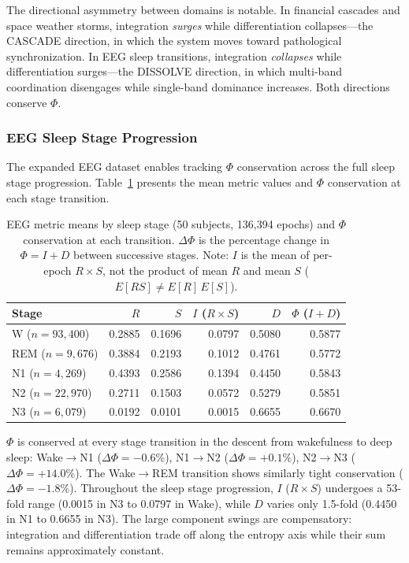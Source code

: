 \documentclass[12pt,a4paper]{article}
\begin{document}
The directional asymmetry between domains is notable. In financial cascades and space weather storms, integration \emph{surges} while differentiation collapses---the CASCADE direction, in which the system moves toward pathological synchronization. In EEG sleep transitions, integration \emph{collapses} while differentiation surges---the DISSOLVE direction, in which multi-band coordination disengages while single-band dominance increases. Both directions conserve $\Phi$.

\subsubsection{EEG Sleep Stage Progression}

The expanded EEG dataset enables tracking $\Phi$ conservation across the full sleep stage progression. Table~\ref{tab:eeg_stages} presents the mean metric values and $\Phi$ conservation at each stage transition.

\begin{table}[H]
\caption{EEG metric means by sleep stage (50 subjects, 136,394 epochs) and $\Phi$ conservation at each transition. $\Delta\Phi$ is the percentage change in $\Phi = I + D$ between successive stages. Note: $I$ is the mean of per-epoch $R \times S$, not the product of mean $R$ and mean $S$ ($E[RS] \neq E[R]\,E[S]$).\label{tab:eeg_stages}}
\begin{tabular}{@{}lrrrrr@{}}
\toprule
Stage & $R$ & $S$ & $I$ ($R{\times}S$) & $D$ & $\Phi$ ($I{+}D$) \\
\midrule
W ($n{=}93{,}400$) & 0.2885 & 0.1696 & 0.0797 & 0.5080 & 0.5877 \\
REM ($n{=}9{,}676$) & 0.3884 & 0.2193 & 0.1012 & 0.4761 & 0.5772 \\
N1 ($n{=}4{,}269$) & 0.4393 & 0.2586 & 0.1394 & 0.4450 & 0.5843 \\
N2 ($n{=}22{,}970$) & 0.2711 & 0.1503 & 0.0572 & 0.5279 & 0.5851 \\
N3 ($n{=}6{,}079$) & 0.0192 & 0.0101 & 0.0015 & 0.6655 & 0.6670 \\
\bottomrule
\end{tabular}
\end{table}

$\Phi$ is conserved at every stage transition in the descent from wakefulness to deep sleep: Wake$\to$N1 ($\Delta\Phi = -0.6\%$), N1$\to$N2 ($\Delta\Phi = +0.1\%$), N2$\to$N3 ($\Delta\Phi = +14.0\%$). The Wake$\to$REM transition shows similarly tight conservation ($\Delta\Phi = -1.8\%$). Throughout the sleep stage progression, $I$ ($R \times S$) undergoes a 53-fold range (0.0015 in N3 to 0.0797 in Wake), while $D$ varies only 1.5-fold (0.4450 in N1 to 0.6655 in N3). The large component swings are compensatory: integration and differentiation trade off along the entropy axis while their sum remains approximately constant.
\end{document}
